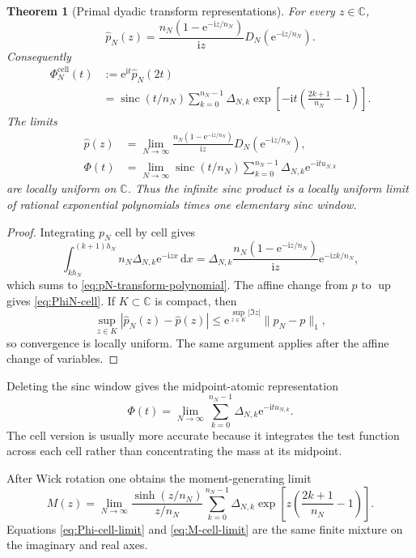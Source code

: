 \documentclass[11pt,oneside]{article}
\newtheorem{theorem}{Theorem}[section]
\theoremstyle{definition}
\theoremstyle{remark}
\newcommand{\C}{\mathbb C}
\newcommand{\Up}{\operatorname{up}}
\newcommand{\sinc}{\operatorname{sinc}}
\newcommand{\e}{\mathrm e}
\newcommand{\ii}{\mathrm i}
\newcommand{\dd}{\,\mathrm d}
\begin{document}
\begin{theorem}[Primal dyadic transform representations]
\label{thm:primal-transform}
For every $z\in\C$,
\begin{equation}\label{eq:pN-transform-polynomial}
 \widehat p_N(z)
 =\frac{n_N(1-\e^{-\ii z/n_N})}{\ii z}
   D_N(\e^{-\ii z/n_N}).
\end{equation}
Consequently
\begin{align}
 \Phi_N^{\mathrm{cell}}(t)
 &:=\e^{\ii t}\widehat p_N(2t)\label{eq:PhiN-cell-def}\\
 &=\sinc(t/n_N)
   \sum_{k=0}^{n_N-1}\Delta_{N,k}
   \exp\!\left[-\ii t\left(\frac{2k+1}{n_N}-1\right)\right].
 \label{eq:PhiN-cell}
\end{align}
The limits
\begin{align}
 \widehat p(z)&=\lim_{N\to\infty}
 \frac{n_N(1-\e^{-\ii z/n_N})}{\ii z}
 D_N(\e^{-\ii z/n_N}),\label{eq:p-transform-mass-limit}\\
 \Phi(t)&=\lim_{N\to\infty}\sinc(t/n_N)
 \sum_{k=0}^{n_N-1}\Delta_{N,k}\e^{-\ii t u_{N,k}}
 \label{eq:Phi-cell-limit}
\end{align}
are locally uniform on $\C$.  Thus the infinite sinc product is a locally
uniform limit of rational exponential polynomials times one elementary sinc
window.
\end{theorem}

\begin{proof}
Integrating $p_N$ cell by cell gives
\[
 \int_{kh_N}^{(k+1)h_N}n_N\Delta_{N,k}\e^{-\ii zx}\dd x
 =\Delta_{N,k}\frac{n_N(1-\e^{-\ii z/n_N})}{\ii z}
  \e^{-\ii zk/n_N},
\]
which sums to \eqref{eq:pN-transform-polynomial}.  The affine change from $p$
to $\Up$ gives \eqref{eq:PhiN-cell}.  If $K\subset\C$ is compact, then
\[
 \sup_{z\in K}|\widehat p_N(z)-\widehat p(z)|
 \le \e^{\sup_{z\in K}|\Im z|}\|p_N-p\|_1,
\]
so convergence is locally uniform.  The same argument applies after the affine
change of variables.
\end{proof}

Deleting the sinc window gives the midpoint-atomic representation
\begin{equation}\label{eq:Phi-atomic-limit}
 \Phi(t)=\lim_{N\to\infty}
 \sum_{k=0}^{n_N-1}\Delta_{N,k}\e^{-\ii t u_{N,k}}.
\end{equation}
The cell version is usually more accurate because it integrates the test
function across each cell rather than concentrating the mass at its midpoint.

After Wick rotation one obtains the moment-generating limit
\begin{equation}\label{eq:M-cell-limit}
 M(z)=\lim_{N\to\infty}
 \frac{\sinh(z/n_N)}{z/n_N}
 \sum_{k=0}^{n_N-1}\Delta_{N,k}
 \exp\!\left[z\left(\frac{2k+1}{n_N}-1\right)\right].
\end{equation}
Equations \eqref{eq:Phi-cell-limit} and \eqref{eq:M-cell-limit} are the same
finite mixture on the imaginary and real axes.
\end{document}

